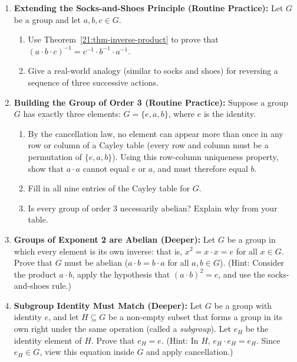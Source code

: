 \begin{enumerate}
\item \textbf{Extending the Socks-and-Shoes Principle (Routine Practice):} Let $G$ be a group and let $a, b, c \in G$.
\begin{enumerate}[label=(\alph*)]
\item Use Theorem~\ref{21:thm-inverse-product} to prove that $(a \cdot b \cdot c)^{-1} = c^{-1} \cdot b^{-1} \cdot a^{-1}$.
\item Give a real-world analogy (similar to socks and shoes) for reversing a sequence of three successive actions.
\end{enumerate}

\item \textbf{Building the Group of Order 3 (Routine Practice):} Suppose a group $G$ has exactly three elements: $G = \{e, a, b\}$, where $e$ is the identity.
\begin{enumerate}[label=(\alph*)]
\item By the cancellation law, no element can appear more than once in any row or column of a Cayley table (every row and column must be a permutation of $\{e, a, b\}$). Using this row-column uniqueness property, show that $a \cdot a$ cannot equal $e$ or $a$, and must therefore equal $b$.
\item Fill in all nine entries of the Cayley table for $G$.
\item Is every group of order 3 necessarily abelian? Explain why from your table.
\end{enumerate}

\item \textbf{Groups of Exponent 2 are Abelian (Deeper):} Let $G$ be a group in which every element is its own inverse: that is, $x^2 = x \cdot x = e$ for all $x \in G$. Prove that $G$ must be abelian ($a \cdot b = b \cdot a$ for all $a, b \in G$). (Hint: Consider the product $a \cdot b$, apply the hypothesis that $(a \cdot b)^2 = e$, and use the socks-and-shoes rule.)

\item \textbf{Subgroup Identity Must Match (Deeper):} Let $G$ be a group with identity $e$, and let $H \subseteq G$ be a non-empty subset that forms a group in its own right under the same operation (called a \emph{subgroup}). Let $e_H$ be the identity element of $H$. Prove that $e_H = e$. (Hint: In $H$, $e_H \cdot e_H = e_H$. Since $e_H \in G$, view this equation inside $G$ and apply cancellation.)
\end{enumerate}

\newpage
